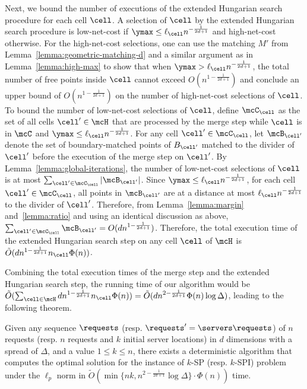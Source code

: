 Next, we bound the number of executions of the extended Hungarian search procedure for each cell $\cell$.
A selection of $\cell$ by the extended Hungarian search procedure is low-net-cost if $\ymax\le \ell_\cell n^{-\frac{1}{2d+1}}$ and high-net-cost otherwise. For the high-net-cost selections, one can use the matching $M'$ from Lemma~\ref{lemma:geometric-matching-d} and a similar argument as in Lemma~\ref{lemma:high-max} to show that when $\ymax> \ell_\cell n^{-\frac{1}{2d+1}}$, the total number of free points inside $\cell$ cannot exceed $O(n^{1-\frac{1}{2d+1}})$ and conclude an upper bound of $O(n^{1-\frac{1}{2d+1}})$ on the number of high-net-cost selections of $\cell$. 
To bound the number of low-net-cost selections of $\cell$, define $\mcC_\cell$ as the set of all cells $\cell'\in\mcH$ that are processed by the merge step while $\cell$ is in $\mcC$ and $\ymax\le \ell_\cell n^{-\frac{1}{2d+1}}$. For any cell $\cell'\in\mcC_\cell$, let $\mcB_{\cell'}$ denote the set of boundary-matched points of $B_{\cell'}$ matched to the divider of $\cell'$ before the execution of the merge step on $\cell'$. By Lemma~\ref{lemma:global-iterations}, the number of low-net-cost selections of $\cell$ is at most $\sum_{\cell'\in\mcC_\cell}|\mcB_{\cell'}|$. Since $\ymax\le \ell_\cell n^{-\frac{1}{2d+1}}$, for each cell $\cell'\in\mcC_\cell$, all points in $\mcB_{\cell'}$ are at a distance at most $\ell_\cell n^{-\frac{1}{2d+1}}$ to the divider of $\cell'$. Therefore, from Lemma~\ref{lemma:margin} and~\ref{lemma:ratio} and using an identical discussion as above, $\sum_{\cell'\in\mcC_\cell}\mcB_{\cell'} = O(dn^{1-\frac{1}{2d+1}})$. Therefore, the total execution time of the extended Hungarian search step on any cell $\cell$ of $\mcH$ is $\tilde{O}(dn^{1-\frac{1}{2d+1}}n_\cell\Phi(n))$. 

Combining the total execution times of the merge step and the extended Hungarian search step, the running time of our algorithm would be $\tilde{O}(\sum_{\cell\in\mcH}dn^{1-\frac{1}{2d+1}}n_\cell\Phi(n)) = \tilde{O}(dn^{2-\frac{1}{2d+1}}\Phi(n)\log\Delta)$, leading to the following theorem.

\begin{theorem}\label{thm:kSP-d}
Given any sequence $\requests$ (resp. $\requests'=\servers\requests$) of $n$ requests (resp. $n$ requests and $k$ initial server locations) in $d$ dimensions with a spread of $\Delta$, and a value $1 \le k \le n$, there exists a deterministic algorithm that computes the optimal solution for the instance of $k$-SP (resp. $k$-SPI) problem under the $\ell_p$ norm in $\tilde{O}(\min\{nk, n^{2-\frac{1}{2d+1}}\log \Delta\}\cdot\Phi(n))$ time.
\end{theorem}

